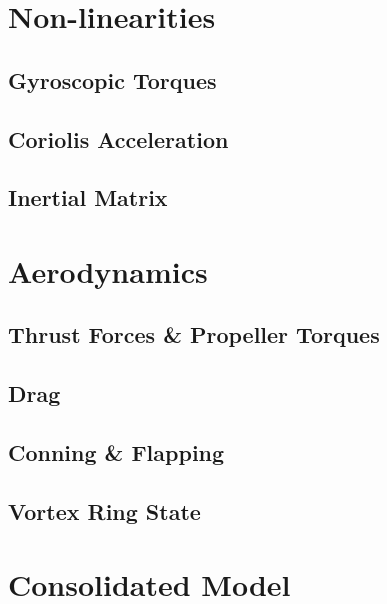 \section{Non-linearities}
\label{sec:dynamics.nonlinearities}
\subsection{Gyroscopic Torques}
\label{subsec:dynamics.nonlinearities.gyrotorques}
\subsection{Coriolis Acceleration}
\label{subsec:dynamics.nonlinearities.coriolis}
\subsection{Inertial Matrix}
\label{subsec:dynamics.nonlinearities.inertia}

\section{Aerodynamics}
\label{sec:dynamics.aero}
\subsection{Thrust Forces \& Propeller Torques}
\label{subsec:dynamics.aero.bem}
\subsection{Drag}
\label{subsec:dynamics.aero.drag}
\subsection{Conning \& Flapping}
\label{subsec:dynamics.aero.flap}
\subsection{Vortex Ring State}
\label{subsec:dynamics.aero.vrs}

\section{Consolidated Model}
\label{sec:dynamics.model}